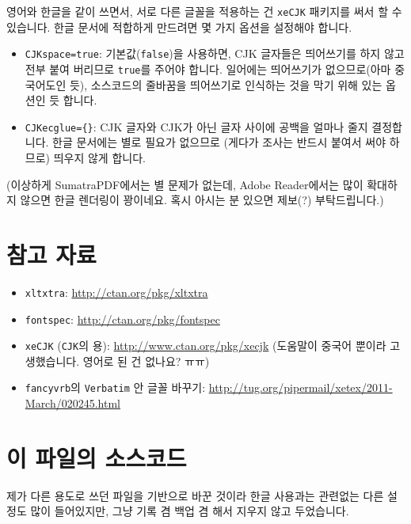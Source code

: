 \documentclass[a4paper]{article}
\numberwithin{equation}{section}
\begin{document}
영어와 한글을 같이 쓰면서, 서로 다른 글꼴을 적용하는 건 \texttt{xeCJK} 패키지를 써서 할 수 있습니다.
한글 문서에 적합하게 만드려면 몇 가지 옵션을 설정해야 합니다.
%
\begin{itemize}
  \item \texttt{CJKspace=true}: 기본값(\texttt{false})을 사용하면, CJK 글자들은 띄어쓰기를 하지 않고 전부 붙여 버리므로 \texttt{true}를 주어야 합니다. 
  일어에는 띄어쓰기가 없으므로(아마 중국어도인 듯), 소스코드의 줄바꿈을 띄어쓰기로 인식하는 것을 막기 위해 있는 옵션인 듯 합니다.

  \item \texttt{CJKecglue=\{\}}: CJK 글자와 CJK가 아닌 글자 사이에 공백을 얼마나 줄지 결정합니다.
  한글 문서에는 별로 필요가 없으므로 (게다가 조사는 반드시 붙여서 써야 하므로) 띄우지 않게 합니다.
\end{itemize}
%
(이상하게 SumatraPDF에서는 별 문제가 없는데, Adobe Reader에서는 많이 확대하지 않으면 한글 렌더링이 꽝이네요.
혹시 아시는 분 있으면 제보(?) 부탁드립니다.)



\section{참고 자료}

\begin{itemize}
  \item \texttt{xltxtra}: \url{http://ctan.org/pkg/xltxtra}
  \item \texttt{fontspec}: \url{http://ctan.org/pkg/fontspec}
  \item \texttt{xeCJK} (\texttt{CJK}의 \XeLaTeX{}용): \url{http://www.ctan.org/pkg/xecjk} (도움말이 중국어 뿐이라 고생했습니다.
  영어로 된 건 없나요? ㅠㅠ)
  \item \texttt{fancyvrb}의 \texttt{Verbatim} 안 글꼴 바꾸기: \url{http://tug.org/pipermail/xetex/2011-March/020245.html}

\end{itemize}



\section{이 파일의 소스코드}

제가 다른 용도로 쓰던 파일을 기반으로 바꾼 것이라 한글 사용과는 관련없는 다른 설정도 많이 들어있지만, 그냥 기록 겸 백업 겸 해서 지우지 않고 두었습니다.

\begin{singlespace}
  {
  }
\end{singlespace}
\end{document}
